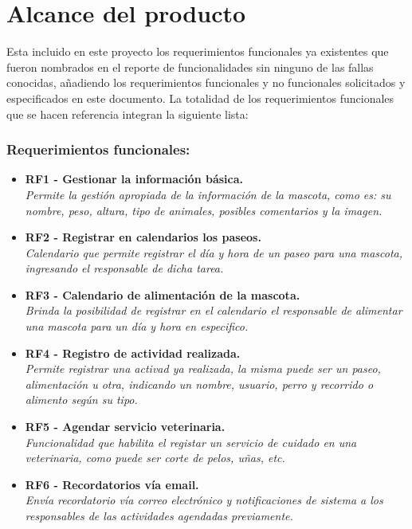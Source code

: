 \section{Alcance del producto}

Esta incluido en este proyecto los requerimientos funcionales ya existentes que fueron nombrados en el reporte de funcionalidades sin ninguno de las fallas conocidas, añadiendo los requerimientos funcionales y no funcionales solicitados y especificados en este documento.
La totalidad de los requerimientos funcionales que se hacen referencia integran la siguiente lista:

\subsubsection{Requerimientos funcionales:}
\begin{itemize}
    \item \textbf{RF1 - Gestionar la información básica.} \\
    \textit{Permite la gestión apropiada de la información de la mascota, como es:
    su nombre, peso, altura, tipo de animales, posibles comentarios y la imagen.}
    \item \textbf{RF2 - Registrar en calendarios los paseos.} \\
    \textit{Calendario que permite registrar el día y hora de un paseo para una mascota, ingresando el responsable de dicha tarea.}
    \item \textbf{RF3 - Calendario de alimentación de la mascota.} \\
    \textit{Brinda la posibilidad de registrar en el calendario el responsable de alimentar una mascota para un día y hora en especifico.}
    \item \textbf{RF4 - Registro de actividad realizada.} \\
    \textit{Permite registrar una activad ya realizada, la misma puede ser un paseo, alimentación u otra, indicando un nombre, usuario, perro y recorrido o alimento según su tipo.}
    \item \textbf{RF5 - Agendar servicio veterinaria.} \\
    \textit{Funcionalidad que habilita el registar un servicio de cuidado en una veterinaria, como puede ser corte de pelos, uñas, etc.}
    \item \textbf{RF6 - Recordatorios vía email.} \\
    \textit{Envía recordatorio vía correo electrónico y notificaciones de sistema a los responsables de las actividades agendadas previamente.}

\end{itemize}
